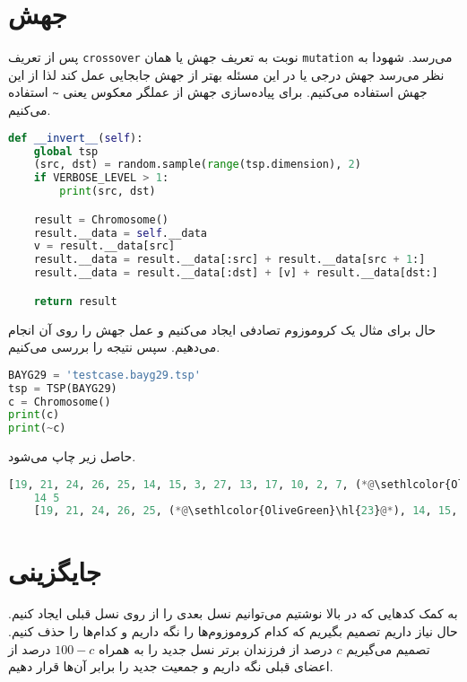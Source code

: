 \documentclass[a4paper, 12pt]{article}
\theoremstyle{definition}
\begin{document}
\section{جهش}
پس از تعریف
\texttt{crossover}
نوبت به تعریف جهش یا همان
\texttt{mutation}
می‌رسد. شهودا به نظر می‌رسد جهش درجی یا
در این مسئله بهتر از جهش جابجایی عمل کند لذا از این جهش استفاده می‌کنیم. برای پیاده‌سازی جهش از عملگر معکوس یعنی
\texttt{\textasciitilde}
استفاده می‌کنیم.

\LTR
\begin{lstlisting}[language=Python]
def __invert__(self):
    global tsp
    (src, dst) = random.sample(range(tsp.dimension), 2)
    if VERBOSE_LEVEL > 1:
        print(src, dst)

    result = Chromosome()
    result.__data = self.__data
    v = result.__data[src]
    result.__data = result.__data[:src] + result.__data[src + 1:]
    result.__data = result.__data[:dst] + [v] + result.__data[dst:]

    return result
\end{lstlisting}
\RTL

حال برای مثال یک کروموزوم تصادفی ایجاد می‌کنیم و عمل جهش را روی آن انجام می‌دهیم. سپس نتیجه را بررسی می‌کنیم.

\LTR
\begin{lstlisting}[language=Python]
BAYG29 = 'testcase.bayg29.tsp'
tsp = TSP(BAYG29)
c = Chromosome()
print(c)
print(~c)    
\end{lstlisting}
\RTL
حاصل زیر چاپ می‌شود.

\LTR
\begin{lstlisting}[language=Python]
    [19, 21, 24, 26, 25, 14, 15, 3, 27, 13, 17, 10, 2, 7, (*@\sethlcolor{OliveGreen}\hl{23}@*), 9, 4, 22, 0, 8, 6, 16, 12, 28, 11, 20, 5, 18, 1]: 4649
    14 5
    [19, 21, 24, 26, 25, (*@\sethlcolor{OliveGreen}\hl{23}@*), 14, 15, 3, 27, 13, 17, 10, 2, 7, 9, 4, 22, 0, 8, 6, 16, 12, 28, 11, 20, 5, 18, 1]: 4738  
\end{lstlisting}
\RTL

\section{جایگزینی}
به کمک کدهایی که در بالا نوشتیم می‌توانیم نسل بعدی را از روی نسل قبلی ایجاد کنیم. حال نیاز داریم تصمیم بگیریم که کدام کروموزوم‌ها را نگه داریم و کدام‌ها را حذف کنیم. تصمیم می‌گیریم
$c$
درصد از فرزندان برتر نسل جدید را به همراه
$100-c$
درصد از اعضای قبلی نگه داریم و جمعیت جدید را برابر آن‌ها قرار دهیم.
\end{document}
